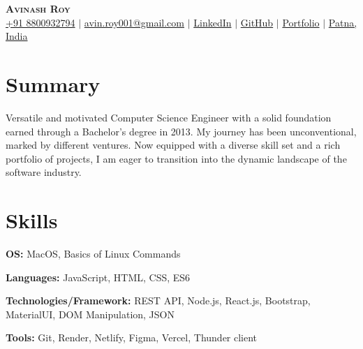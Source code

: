 \documentclass[letterpaper,11pt]{article}
\newcommand{\resumeSubHeadingListStart}{\begin{itemize}[leftmargin=0.15in, label={}]}
\newcommand{\resumeSubHeadingListEnd}{\end{itemize}}
\begin{document}

\begin{center}
    \textbf{\Huge \scshape Avinash Roy} \\ \vspace{3pt}
    \small
    \faMobile \hspace{.5pt} \href{tel:8800932794}{+91 8800932794}
    $|$
    \faAt \hspace{.5pt} \href{mailto:avin.roy001@gmail.com}{avin.roy001@gmail.com}
    $|$
    \faLinkedinSquare \hspace{.5pt} \href{https://www.linkedin.com/in/avinash-roy-73aa597b/}{LinkedIn}
    $|$
    \faGithub \hspace{.5pt} \href{https://github.com/avinroy001}{GitHub}
    $|$
    \faGlobe \hspace{.5pt} \href{https://www.crio.do/learn/portfolio/avin-roy001/?edit=true}{Portfolio}
    $|$
    \faMapMarker \hspace{.5pt} \href{https://maps.app.goo.gl/aqxroPZMkGD1uSbz8}{Patna, India}
\end{center}
\section {Summary}
Versatile and motivated Computer Science Engineer with a solid foundation earned through a Bachelor's degree in 2013. My journey has been unconventional, marked by different ventures. Now equipped with a diverse skill set and a rich portfolio of projects, I am eager to transition into the dynamic landscape of the software industry.
\vspace{-10pt}

\section{Skills}
  \vspace{2pt}
  \resumeSubHeadingListStart
    \small{\item{
        \textbf{OS:}{ MacOS, Basics of Linux Commands} \\ \vspace{3pt}
        
        \textbf{Languages:}{ JavaScript, HTML, CSS, ES6} \\ \vspace{3pt}
        
        \textbf{Technologies/Framework:}{ REST API, Node.js, React.js, Bootstrap, MaterialUI, DOM Manipulation, JSON} \\ \vspace{3pt}
        
        \textbf{Tools:}{ Git, Render, Netlify, Figma, Vercel, Thunder client} \\ \vspace{3pt}
        
    }}
  \resumeSubHeadingListEnd
    \vspace{-15pt}
\end{document}
